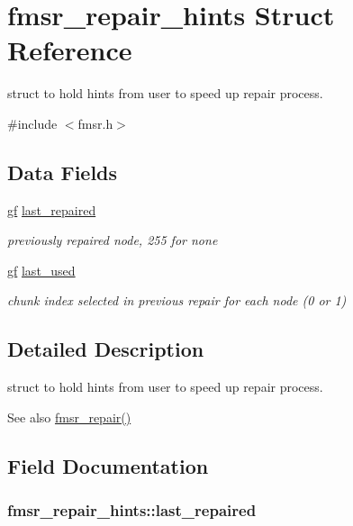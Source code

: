 \hypertarget{structfmsr__repair__hints}{\section{fmsr\-\_\-repair\-\_\-hints \-Struct \-Reference}
\label{structfmsr__repair__hints}
}


struct to hold hints from user to speed up repair process.  




{\ttfamily \#include $<$fmsr.\-h$>$}

\subsection*{\-Data \-Fields}
\begin{DoxyCompactItemize}
\item 
\hyperlink{gf_8h_a339b4ec591f7b3fed03e4be7c9482508}{gf} \hyperlink{structfmsr__repair__hints_ae00d89f4abf9a802761f36b8e0d197e4}{last\-\_\-repaired}
\begin{DoxyCompactList}\small\item\em previously repaired node, 255 for none \end{DoxyCompactList}\item 
\hyperlink{gf_8h_a339b4ec591f7b3fed03e4be7c9482508}{gf} \hyperlink{structfmsr__repair__hints_a17f34e84f1c239e4e61fe42ff339fb5e}{last\-\_\-used}
\begin{DoxyCompactList}\small\item\em chunk index selected in previous repair for each node (0 or 1) \end{DoxyCompactList}\end{DoxyCompactItemize}


\subsection{\-Detailed \-Description}
struct to hold hints from user to speed up repair process. 

\begin{DoxySeeAlso}{\-See also}
\hyperlink{fmsr_8c_aba1540735cbbc0b921f8b0e6df977478}{fmsr\-\_\-repair()} 
\end{DoxySeeAlso}


\subsection{\-Field \-Documentation}
\hypertarget{structfmsr__repair__hints_ae00d89f4abf9a802761f36b8e0d197e4}{
\subsubsection[{last\-\_\-repaired}]{ {\bf fmsr\-\_\-repair\-\_\-hints\-::last\-\_\-repaired}}}\label{structfmsr__repair__hints_ae00d89f4abf9a802761f36b8e0d197e4}


